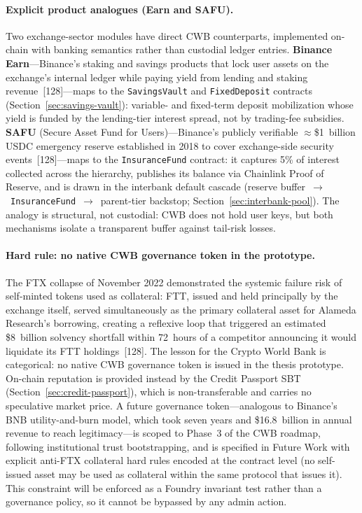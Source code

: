 \documentclass[12pt,a4paper]{report}
\begin{document}
\paragraph{Explicit product analogues (Earn and SAFU).}
Two exchange-sector modules have direct CWB counterparts, implemented on-chain with banking semantics rather than custodial ledger entries. \textbf{Binance Earn}---Binance's staking and savings products that lock user assets on the exchange's internal ledger while paying yield from lending and staking revenue~[128]---maps to the \texttt{SavingsVault} and \texttt{FixedDeposit} contracts (Section~\ref{sec:savings-vault}): variable- and fixed-term deposit mobilization whose yield is funded by the lending-tier interest spread, not by trading-fee subsidies. \textbf{SAFU} (Secure Asset Fund for Users)---Binance's publicly verifiable $\approx$\$1~billion USDC emergency reserve established in 2018 to cover exchange-side security events~[128]---maps to the \texttt{InsuranceFund} contract: it captures 5\% of interest collected across the hierarchy, publishes its balance via Chainlink Proof of Reserve, and is drawn in the interbank default cascade (reserve buffer~$\to$~\texttt{InsuranceFund}~$\to$~parent-tier backstop; Section~\ref{sec:interbank-pool}). The analogy is structural, not custodial: CWB does not hold user keys, but both mechanisms isolate a transparent buffer against tail-risk losses.

\paragraph{Hard rule: no native CWB governance token in the prototype.}
The FTX collapse of November 2022 demonstrated the systemic failure risk of self-minted tokens used as collateral: FTT, issued and held principally by the exchange itself, served simultaneously as the primary collateral asset for Alameda Research's borrowing, creating a reflexive loop that triggered an estimated \$8~billion solvency shortfall within 72~hours of a competitor announcing it would liquidate its FTT holdings~[128]. The lesson for the Crypto World Bank is categorical: no native CWB governance token is issued in the thesis prototype. On-chain reputation is provided instead by the Credit Passport SBT (Section~\ref{sec:credit-passport}), which is non-transferable and carries no speculative market price. A future governance token---analogous to Binance's BNB utility-and-burn model, which took seven years and \$16.8~billion in annual revenue to reach legitimacy---is scoped to Phase~3 of the CWB roadmap, following institutional trust bootstrapping, and is specified in Future Work with explicit anti-FTX collateral hard rules encoded at the contract level (no self-issued asset may be used as collateral within the same protocol that issues it). This constraint will be enforced as a Foundry invariant test rather than a governance policy, so it cannot be bypassed by any admin action.
\end{document}
